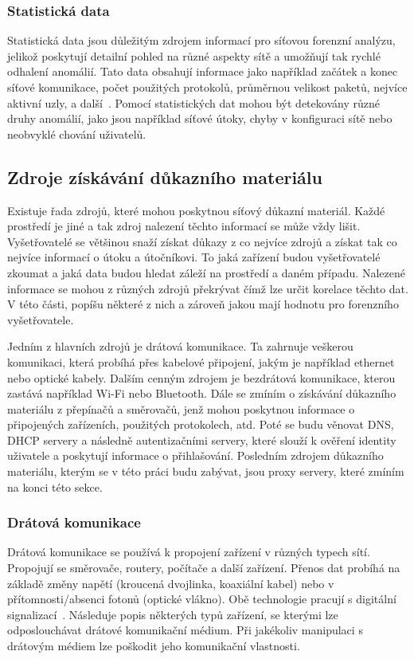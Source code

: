     \subsubsection*{Statistická data}
    Statistická data jsou důležitým zdrojem informací pro síťovou forenzní analýzu, jelikož poskytují detailní pohled na různé aspekty sítě a umožňují tak rychlé odhalení anomálií. Tato data obsahují informace jako například začátek a konec síťové komunikace, počet použitých protokolů, průměrnou velikost paketů, nejvíce aktivní uzly, a další~\cite{EnisaReference}. Pomocí statistických dat mohou být detekovány různé druhy anomálií, jako jsou například síťové útoky, chyby v konfiguraci sítě nebo neobvyklé chování uživatelů.
    

    \subsection{Zdroje získávání důkazního materiálu}
    \label{sec:Zdroje získávání důkazního materiálu}
        Existuje řada zdrojů, které mohou poskytnou síťový důkazní materiál. Každé prostředí je jiné a tak zdroj nalezení těchto informací se může vždy lišit. Vyšetřovatelé se většinou snaží získat důkazy z co nejvíce zdrojů a získat tak co nejvíce informací o útoku a útočníkovi. To jaká zařízení budou vyšetřovatelé zkoumat a jaká data budou hledat záleží na prostředí a daném případu. Nalezené informace se mohou z různých zdrojů překrývat čímž lze určit korelace těchto dat. \newline V této části, popíšu některé z nich a zároveň jakou mají hodnotu pro forenzního vyšetřovatele.
        
        
        Jedním z hlavních zdrojů je drátová komunikace. Ta zahrnuje veškerou komunikaci, která probíhá přes kabelové připojení, jakým je například ethernet nebo optické kabely. Dalším cenným zdrojem je bezdrátová komunikace, kterou zastává například Wi-Fi nebo Bluetooth. Dále se zmíním o získávání důkazního materiálu z přepínačů a směrovačů, jenž mohou poskytnou informace o připojených zařízeních, použitých protokolech, atd. Poté se budu věnovat \gls{DNS}, \gls{DHCP} servery a následně autentizačními servery, které slouží k ověření identity uživatele \newline a poskytují informace o přihlašování. Posledním zdrojem důkazního materiálu, kterým se v této práci budu zabývat, jsou proxy servery, které zmíním na konci této sekce.

        \subsubsection*{Drátová komunikace}
            Drátová komunikace se používá k propojení zařízení v různých typech sítí. Propojují se směrovače, routery, počítače a další zařízení. Přenos dat probíhá na základě změny napětí (kroucená dvojlinka, koaxiální kabel) nebo v přítomnosti/absenci fotonů (optické vlákno). Obě technologie pracují s digitální signalizací~\cite{ComputerNetworking}. Následuje popis některých typů zařízení, se kterými lze odposlouchávat drátové komunikační médium. Při jakékoliv manipulaci s drátovým médiem lze poškodit jeho komunikační vlastnosti.


